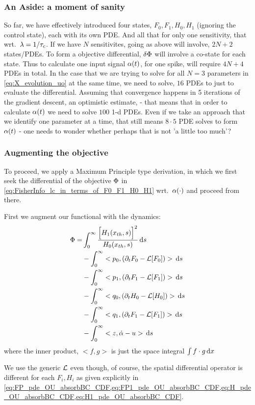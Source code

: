 \documentclass{article}
\begin{document}
\subsubsection{An Aside: a moment of sanity}
So far, we have effectively introduced four states, $F_0, F_1, H_0, H_1$
(ignoring the control state), each with its own PDE. And all that for only one
sensitivity, that wrt.\ ${\lambda} = 1/{ \tau_{c} }$. If we have $N$ sensitivites, going as
above will involve, $2N+2$ states/PDEs. To form a objective differential,
$\delta {\Phi}$ will involve a co-state for each state. Thus to calculate one input
signal ${\alpha}(t)$, for one spike, will require $4N+4$ PDEs in total. In the case
that we are trying to solve for all $N=3$ parameters in \cref{eq:X_evolution_uo}
at the same time, we need to solve, $16$ PDEs to just to evaluate the
differential. Assuming that convergence happens in 5 iterations of the gradient
descent, an optimistic estimate, - that means that in order to calculate ${\alpha}(t)$
we need to solve $100$ 1-d PDEs. Even if we take an approach that we identify
one parameter at a time, that still means $8\cdot 5$ PDE solves to form ${\alpha}(t)$
- one needs to wonder whether perhaps that is not 'a little too much'?

\subsubsection{Augmenting the objective}
To proceed, we apply a Maximum Principle
type derivation, in which we first seek the differential of the objective ${\Phi}$
in \cref{eq:FisherInfo_lc_in_terms_of_F0_F1_H0_H1} wrt.\ ${\alpha}(\cdot)$ and
proceed from there. 

First we augment our functional with the dynamics:
\begin{align}
{\Phi} =& \int_0^{\infty} \frac{\Big[ H_1({ x_{th} }, s) \Big]^2}{H_0({ x_{th} }, s)}  
	\, \mathrm{d} s
	 \\
	  &- \int_0^\infty <p_0, ({\partial}_t F_0 - { \mathcal{L} }[F_0])> \, \mathrm{d} s
	  \\
	  &- \int_0^\infty <p_1, ({\partial}_t F_1 - { \mathcal{L} }[F_1])> \, \mathrm{d} s
	  \\
	  &- \int_0^\infty <q_0, ({\partial}_t H_0 - { \mathcal{L} }[H_0])> \, \mathrm{d} s
	  	  \\
	  &- \int_0^\infty <q_1, ({\partial}_t F_1 - { \mathcal{L} }[F_1])> \, \mathrm{d} s
	  	  \\
	  &- \int_0^\infty <z, { \dot{\alpha} } - u> \, \mathrm{d} s
\end{align}
where the inner product, $<f, g>$ is just the space integral $\int f\cdot g
\, \mathrm{d} x$

We use the generic ${ \mathcal{L} }$ even though, of course, the spatial differential
operator is different for each $F_i, H_i$ as given explicitly in
\cref{eq:FP_pde_OU_absorbBC_CDF,eq:FP1_pde_OU_absorbBC_CDF,eq:H_pde_OU_absorbBC_CDF,eq:H1_pde_OU_absorbBC_CDF}.
\end{document}
